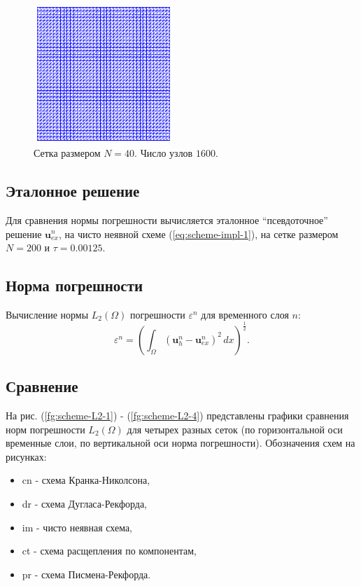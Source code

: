 \documentclass[12pt]{article}
\begin{document}
\begin{figure}
	\begin{center}
		\includegraphics[width=200px]{pics/mesh}
		\caption{Сетка размером $N=40$. Число узлов $1600$.}
		\label{fg:scheme-mesh}
	\end{center}
\end{figure}

\subsection{Эталонное решение}
Для сравнения нормы погрешности вычисляется эталонное ``псевдоточное'' решение ${\bm u}_{ex}^n$, на чисто неявной схеме (\ref{eq:scheme-impl-1}), на сетке размером $N=200$ и $\tau=0.00125$.

\subsection{Норма погрешности}
Вычисление нормы $L_2(\Omega)$ погрешности $\varepsilon^n$ для временного слоя $n$:
$$
\varepsilon^n = \left(\int_{\Omega} ({\bm u}_h^n - {\bm u}_{ex}^n )^2 \, dx\right)^{\frac{1}{2}}.
$$

\subsection{Сравнение}
На рис. (\ref{fg:scheme-L2-1}) - (\ref{fg:scheme-L2-4}) представлены графики сравнения норм погрешности $L_2(\Omega)$  для четырех разных сеток (по горизонтальной оси временные слои, по вертикальной оси норма погрешности). Обозначения схем на рисунках:
\begin{itemize}
\item cn - схема Кранка-Николсона,
\item dr - схема Дугласа-Рекфорда,
\item im - чисто неявная схема,
\item ct - схема расщепления по компонентам,
\item pr - схема Писмена-Рекфорда.
\end{itemize}
\end{document}
